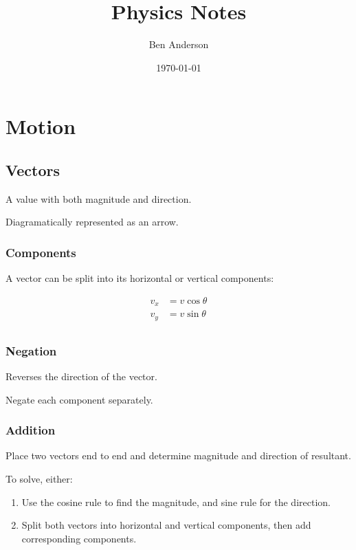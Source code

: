 \documentclass[a4paper,11pt]{report}
\begin{document}
\title{Physics Notes}
\author{Ben Anderson}
\date{\today}
\maketitle
\pagebreak

\tableofcontents
\pagebreak




\chapter{Motion}

\section{Vectors}

A value with both magnitude and direction.

Diagramatically represented as an arrow.

\subsection{Components}

A vector can be split into its horizontal or vertical components:

$$
\begin{aligned}
v_x & = v \cos{\theta} \\
v_y & = v \sin{\theta} \\
\end{aligned}
$$

\subsection{Negation}

Reverses the direction of the vector.

Negate each component separately.

\subsection{Addition}

Place two vectors end to end and determine magnitude and direction of
resultant.

To solve, either:

\begin{enumerate}
\item Use the cosine rule to find the magnitude, and sine rule for the
	direction.
\item Split both vectors into horizontal and vertical components, then add
	corresponding components.
\end{enumerate}
\end{document}
